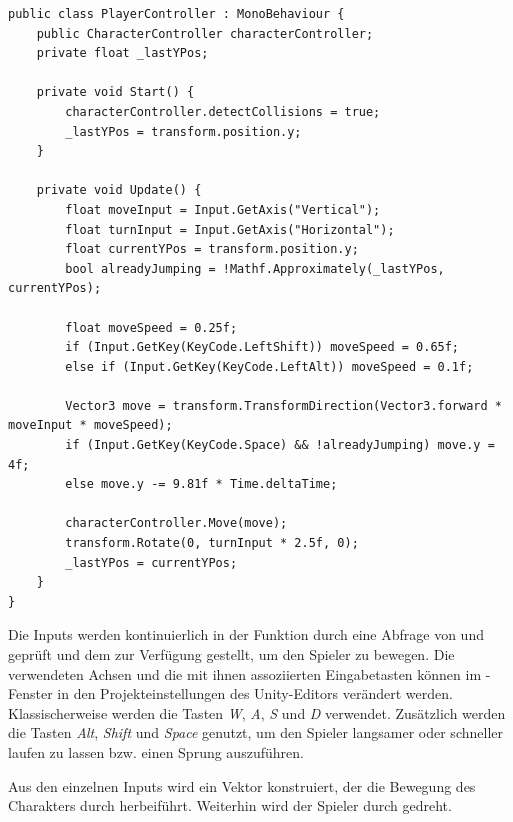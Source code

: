 \begin{minipage}{\linewidth}
\begin{lstlisting}[linewidth=16.4cm, label=lst:player_controller, caption=Implementierung des \inlinecode{PlayerController}, xleftmargin=1cm]
public class PlayerController : MonoBehaviour {
    public CharacterController characterController;
    private float _lastYPos;

    private void Start() {
        characterController.detectCollisions = true;
        _lastYPos = transform.position.y;
    }

    private void Update() {
        float moveInput = Input.GetAxis("Vertical");
        float turnInput = Input.GetAxis("Horizontal");
        float currentYPos = transform.position.y;
        bool alreadyJumping = !Mathf.Approximately(_lastYPos, currentYPos);

        float moveSpeed = 0.25f;
        if (Input.GetKey(KeyCode.LeftShift)) moveSpeed = 0.65f;
        else if (Input.GetKey(KeyCode.LeftAlt)) moveSpeed = 0.1f;

        Vector3 move = transform.TransformDirection(Vector3.forward * moveInput * moveSpeed);
        if (Input.GetKey(KeyCode.Space) && !alreadyJumping) move.y = 4f;
        else move.y -= 9.81f * Time.deltaTime;

        characterController.Move(move);
        transform.Rotate(0, turnInput * 2.5f, 0);
        _lastYPos = currentYPos;
    }
}
\end{lstlisting}
\end{minipage}

Die Inputs werden kontinuierlich in der Funktion  durch eine Abfrage von  und  geprüft und dem  zur Verfügung gestellt, um den Spieler zu bewegen. Die verwendeten Achsen und die mit ihnen assoziierten Eingabetasten können im -Fenster in den Projekteinstellungen des Unity-Editors verändert werden. Klassischerweise werden die Tasten \textit{W}, \textit{A}, \textit{S} und \textit{D} verwendet. Zusätzlich werden die Tasten \textit{Alt}, \textit{Shift} und \textit{Space} genutzt, um den Spieler langsamer oder schneller laufen zu lassen bzw. einen Sprung auszuführen.

Aus den einzelnen Inputs wird ein Vektor konstruiert, der die Bewegung des Charakters durch  herbeiführt. Weiterhin wird der Spieler durch  gedreht.








